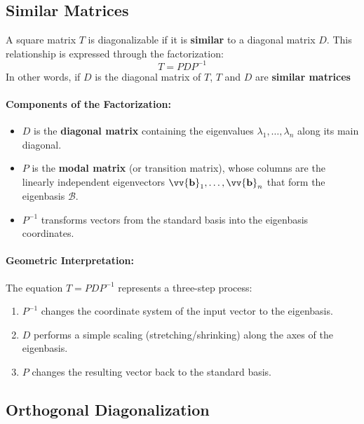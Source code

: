 \documentclass[11pt]{article}
\DeclareRobustCommand{\myvec}[1]{\vv{\mathbf{#1}}}
\newcommand{\myset}[1]{\mathcal{#1}}
\newcommand{\mymat}[1]{#1}
\begin{document}
    \subsection{Similar Matrices}
    A square matrix $\mymat{T}$ is diagonalizable if it is \textbf{similar} to a diagonal matrix $\mymat{D}$. This relationship is expressed through the factorization:
    \begin{equation}
        \mymat{T} = \mymat{P}\mymat{D}\mymat{P}^{-1}
    \end{equation}
    In other words, if $\mymat{D}$ is the diagonal matrix of $\mymat{T}$, $\mymat{T}$ and $\mymat{D}$ are \textbf{similar matrices} 
    \paragraph{Components of the Factorization:}
    \begin{itemize}
        \item $\mymat{D}$ is the \textbf{diagonal matrix} containing the eigenvalues $\lambda_1, \dots, \lambda_n$ along its main diagonal.
        \item $\mymat{P}$ is the \textbf{modal matrix} (or transition matrix), whose columns are the linearly independent eigenvectors $\myvec{b}_1, \dots, \myvec{b}_n$ that form the eigenbasis $\myset{B}$.
        \item $\mymat{P}^{-1}$ transforms vectors from the standard basis into the eigenbasis coordinates.
    \end{itemize}

    \paragraph{Geometric Interpretation:}
    The equation $\mymat{T} = \mymat{P}\mymat{D}\mymat{P}^{-1}$ represents a three-step process:
    \begin{enumerate}
        \item $\mymat{P}^{-1}$ changes the coordinate system of the input vector to the eigenbasis.
        \item $\mymat{D}$ performs a simple scaling (stretching/shrinking) along the axes of the eigenbasis.
        \item $\mymat{P}$ changes the resulting vector back to the standard basis.
    \end{enumerate}
    
    \subsection{Orthogonal Diagonalization}
\end{document}
